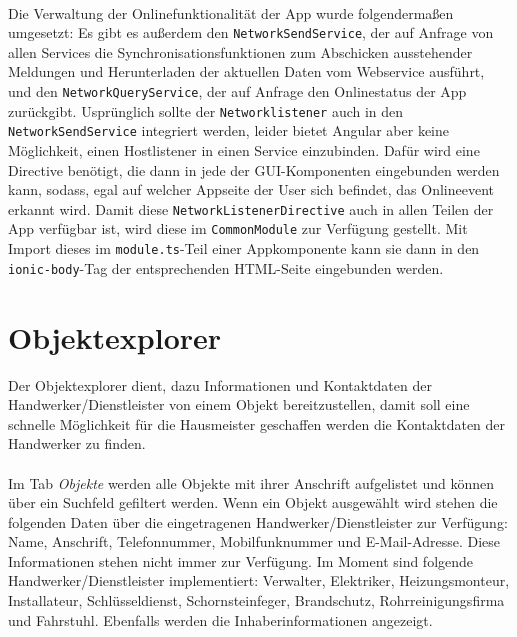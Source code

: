 \documentclass[12pt]{article}
\begin{document}
\paragraph{}
Die Verwaltung der Onlinefunktionalität der App wurde folgendermaßen umgesetzt: Es gibt es außerdem den \texttt{NetworkSendService}, der auf Anfrage von allen Services die Synchronisationsfunktionen zum Abschicken ausstehender Meldungen und Herunterladen der aktuellen Daten vom Webservice ausführt, und den \texttt{NetworkQueryService}, der auf Anfrage den Onlinestatus der App zurückgibt. Usprünglich sollte der \texttt{Networklistener} auch in den \texttt{NetworkSendService} integriert werden, leider bietet Angular aber keine Möglichkeit, einen Hostlistener in einen Service einzubinden. Dafür wird eine Directive benötigt, die dann in jede der GUI-Komponenten eingebunden werden kann, sodass, egal auf welcher Appseite der User sich befindet, das Onlineevent erkannt wird. Damit diese \texttt{NetworkListenerDirective} auch in allen Teilen der App verfügbar ist, wird diese im \texttt{CommonModule} zur Verfügung gestellt. Mit Import dieses im \texttt{module.ts}-Teil einer Appkomponente kann sie dann in den \texttt{ionic-body}-Tag der entsprechenden HTML-Seite eingebunden werden.

\section{Objektexplorer}
Der Objektexplorer dient, dazu Informationen und Kontaktdaten der Handwerker/Dienstleister von einem Objekt bereitzustellen, damit soll eine schnelle Möglichkeit für die Hausmeister geschaffen werden die Kontaktdaten der Handwerker zu finden.

\paragraph{}Im Tab \textit{Objekte} werden alle Objekte mit ihrer Anschrift aufgelistet und können über ein Suchfeld gefiltert werden. Wenn ein Objekt ausgewählt wird stehen die folgenden Daten über die eingetragenen Handwerker/Dienstleister zur Verfügung: Name, Anschrift, Telefonnummer, Mobilfunknummer und E-Mail-Adresse. Diese Informationen stehen nicht immer zur Verfügung. Im Moment sind folgende Handwerker/Dienstleister implementiert: Verwalter, Elektriker, Heizungsmonteur, Installateur, Schlüsseldienst, Schornsteinfeger, Brandschutz, Rohrreinigungsfirma und Fahrstuhl. Ebenfalls werden die Inhaberinformationen angezeigt.
\end{document}
